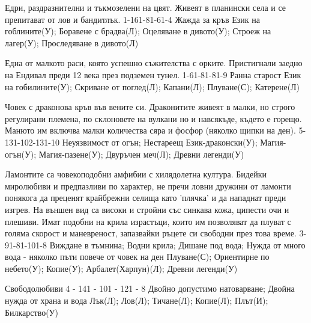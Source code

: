 \begin{multicols}{2}
{Едри, раздразнителни и тъкмозелени на цвят.
Живеят в планински села и се препитават от лов и бандитлък.}
{1-16}{1-8}{1-6}{1-4}
{
Жажда за кръв %
}
{
Език на гоблините(У);
Боравене с брадва(Л);
Оцеляване в дивото(У);
Строеж на лагер(У);
Проследяване в дивото(Л)
}

{Една от малкото раси, която успешно съжителства с орките.
Пристигнали заедно на Ендивал преди 12 века през подземен тунел.}
{1-6}{1-8}{1-8}{1-9}
{
Ранна старост
}
{
Език на гобилините(У);
Скриване от поглед(Л);
Капани(Л);
Плуване(С);
Катерене(Л)
}

{Човек с драконова кръв във вените си.
Драконитите живеят в малки, но строго регулирани племена, по склоновете на вулкани но и навсякъде, където е горещо.
Манюто им включва малки количества сяра и фосфор (няколко щипки на ден).}
{5-13}{1-10}{2-13}{1-10}
{
Неуязвимост от огън;
Нестареещ
}
{
Език-драконски(У);
Магия-огън(У);
Магия-пазене(У);
Двуръчен меч(Л);
Древни легенди(У)
}


{Ламонтите са човекоподобни амфибии с хилядолетна култура.
Бидейки миролюбиви и предпазливи по характер, не пречи ловни дружини от ламонти понякога да преценят крайбрежни селища като 'плячка' и да нападнат преди изгрев.
На външен вид са високи и стройни със синкава кожа, ципести очи и плешиви.
Имат подобни на крила израстъци, които им позволяват да плуват с голяма скорост и маневреност, запазвайки ръцете си свободни през това време.}
{3-9}{1-8}{1-10}{1-8}
{
Виждане в тъмнина;
Водни крила;
Дишане под вода;
Нужда от много вода - няколко пъти повече от човек на ден
}
{
Плуване(С);
Ориентирне по небето(У);
Копие(У);
Арбалет(Харпун)(Л);
Древни легенди(У)
}


{Свободолюбиви}
{4 - 14}{1 - 10}{1 - 12}{1 - 8}
{
Двойно допустимо натоварване;
Двойна нужда от храна и вода
}
{
Лък(Л);
Лов(Л);
Тичане(Л);
Копие(Л);
Плът(И);
Билкарство(У)
}


\end{multicols}
